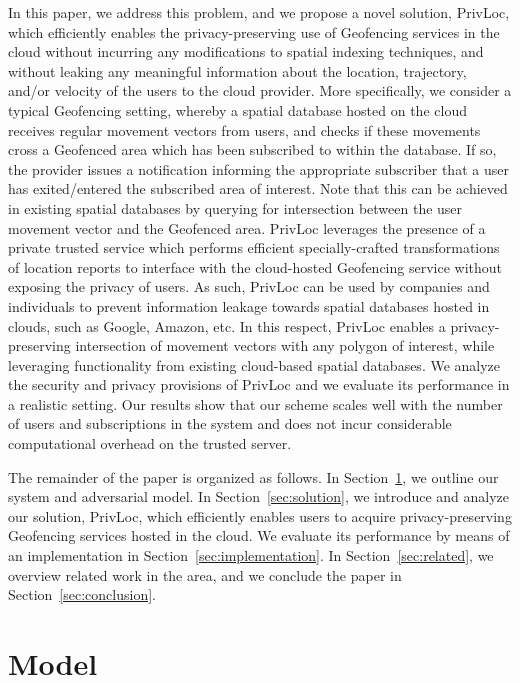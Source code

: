 \documentclass{llncs}
\newcommand\sol{{\sf PrivLoc}}
\begin{document}
 In this paper, we address this problem, and we propose a novel solution, \sol, which efficiently enables the privacy-preserving use of Geofencing services in the cloud without incurring any modifications to spatial indexing techniques, and without
 leaking any meaningful information about the location, trajectory, and/or velocity of the users to the cloud provider. More specifically, we consider a typical Geofencing setting, whereby
 a spatial database hosted on the cloud receives regular movement vectors from users, and checks if these movements cross a Geofenced area which has been subscribed to within the database. If so, the provider issues a notification
 informing the appropriate subscriber that a user has exited/entered the subscribed area of interest. Note that this can be achieved in existing spatial databases by querying for intersection between the user movement vector and the
 Geofenced area. \sol{} leverages the presence of a private trusted service which performs efficient specially-crafted transformations of location reports to interface with the cloud-hosted Geofencing service without exposing
the privacy of users. As such, \sol{} can be used by companies and individuals to prevent information leakage towards spatial databases hosted in clouds, such as Google, Amazon, etc.
In this respect, \sol{} enables a privacy-preserving intersection of movement vectors with any polygon of interest, while leveraging functionality from existing cloud-based spatial databases. We analyze the security and
 privacy provisions
of \sol{} and we evaluate its performance in a realistic setting. Our results show that our scheme scales well with the number of users and subscriptions in the system and does not incur considerable computational overhead on the trusted server.

The remainder of the paper is organized as follows. In Section~\ref{sec:model}, we outline our system and adversarial model. In Section~\ref{sec:solution}, we introduce and analyze our solution, \sol, which efficiently enables users to
acquire privacy-preserving Geofencing services hosted in the cloud. We evaluate its performance by means of an implementation in Section~\ref{sec:implementation}.
 In Section~\ref{sec:related}, we overview related work in the area, and we conclude the paper in Section~\ref{sec:conclusion}.



\section{Model}\label{sec:model}
\end{document}
